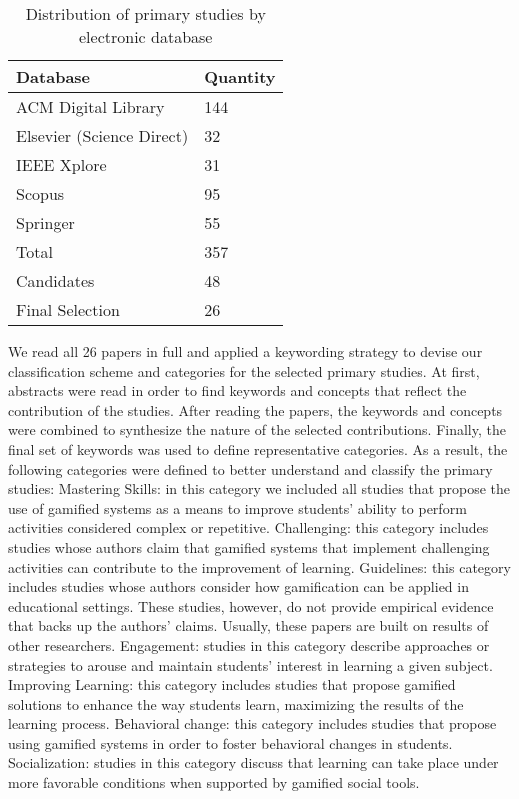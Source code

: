\begin{table}[]
\centering
\caption{Distribution of primary studies by electronic database }
\label{tab:distribution_of_primary_studies}
\begin{tabular}{|l|l|}
\hline
\textbf{Database}         & \textbf{Quantity} \\ \hline
ACM Digital Library       & 144               \\ \hline
Elsevier (Science Direct) & 32                \\ \hline
IEEE Xplore               & 31                \\ \hline
Scopus                    & 95                \\ \hline
Springer                  & 55                \\ \hline
Total                     & 357               \\ \hline
Candidates                & 48                \\ \hline
Final Selection           & 26                \\ \hline
\end{tabular}
\end{table}

We read all 26 papers in full and applied a keywording strategy to
devise our classification scheme and categories for the selected
primary studies. At first, abstracts were read in order to find
keywords and concepts that reflect the contribution of the studies.
After reading the papers, the keywords and concepts were
combined to synthesize the nature of the selected contributions.
Finally, the final set of keywords was used to define representative
categories. As a result, the following categories were defined to
better understand and classify the primary studies:
Mastering Skills: in this category we included all studies that
propose the use of gamified systems as a means to improve
students' ability to perform activities considered complex or
repetitive.
Challenging: this category includes studies whose authors claim
that gamified systems that implement challenging activities can
contribute to the improvement of learning.
Guidelines: this category includes studies whose authors consider
how gamification can be applied in educational settings. These
studies, however, do not provide empirical evidence that backs up
the authors' claims. Usually, these papers are built on results of
other researchers.
Engagement: studies in this category describe approaches or
strategies to arouse and maintain students' interest in learning a
given subject.
Improving Learning: this category includes studies that propose
gamified solutions to enhance the way students learn, maximizing
the results of the learning process.
Behavioral change: this category includes studies that propose
using gamified systems in order to foster behavioral changes in
students.
Socialization: studies in this category discuss that learning can take
place under more favorable conditions when supported by gamified
social tools.


